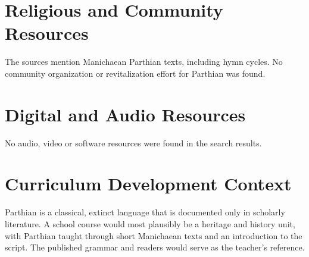\documentclass[12pt]{article}
\begin{document}
\section{Religious and Community Resources}
The sources mention Manichaean Parthian texts, including hymn cycles. No community organization or revitalization effort for Parthian was found.

\section{Digital and Audio Resources}
No audio, video or software resources were found in the search results.

\section{Curriculum Development Context}
Parthian is a classical, extinct language that is documented only in scholarly literature. A school course would most plausibly be a heritage and history unit, with Parthian taught through short Manichaean texts and an introduction to the script. The published grammar and readers would serve as the teacher's reference.
\end{document}
